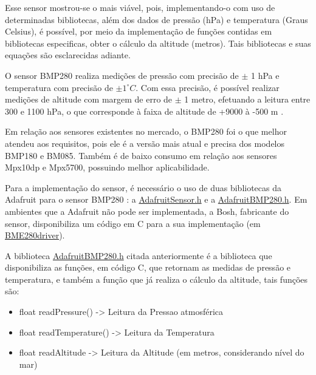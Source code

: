 \par Esse sensor mostrou-se o mais viável, pois, implementando-o com uso de determinadas bibliotecas, além dos dados de pressão (hPa) e temperatura (Graus Celsius), é possível, por meio da implementação de funções contidas em bibliotecas especificas, obter o cálculo da altitude (metros). Tais bibliotecas e suas equações são esclarecidas adiante.

\par O sensor BMP280 realiza medições de pressão com precisão de $\pm$ 1 hPa e temperatura com precisão de $\pm 1 ^\circ C $. Com essa precisão, é possível realizar medições de altitude com margem de erro de  $\pm$ 1 metro, efetuando a leitura entre 300 e 1100 hPa, o que corresponde à faixa de altitude de +9000 à -500 m \cite{cia_BMP280_2017}.

\par Em relação aos sensores existentes no mercado, o BMP280 foi o que melhor atendeu aos requisitos, pois ele é a versão mais atual e precisa dos modelos BMP180 e BM085. Também é de baixo consumo em relação aos sensores Mpx10dp e Mpx5700, possuindo melhor aplicabilidade.

\par Para a implementação do sensor, é necessário o uso de duas bibliotecas da Adafruit para o sensor BMP280 \cite{Adafruit}: a  \href{https://github.com/adafruit/Adafruit_BMP280_Library}{Adafruit\textunderscore Sensor.h} e a \href{https://github.com/adafruit/Adafruit_Sensor}{Adafruit\textunderscore BMP280.h}. Em ambientes que a Adafruit não pode ser implementada, a Bosh, fabricante do sensor, disponibiliza um código em C para a sua implementação (em \href{https://github.com/BoschSensortec/BME280_driver}{BME280\textunderscore driver}).

\par A biblioteca \href{https://github.com/adafruit/Adafruit_Sensor}{Adafruit\textunderscore BMP280.h} citada anteriormente é a biblioteca que disponibiliza as funções, em código C, que retornam as medidas de pressão e temperatura, e também a função que já realiza o cálculo da altitude, tais funções são:

	\begin{itemize}
	    \item float readPressure() -> Leitura da Pressao atmosférica
	    \item float readTemperature() -> Leitura da Temperatura
	    \item float readAltitude -> Leitura da Altitude (em metros, considerando nível do mar)
	\end{itemize} 

